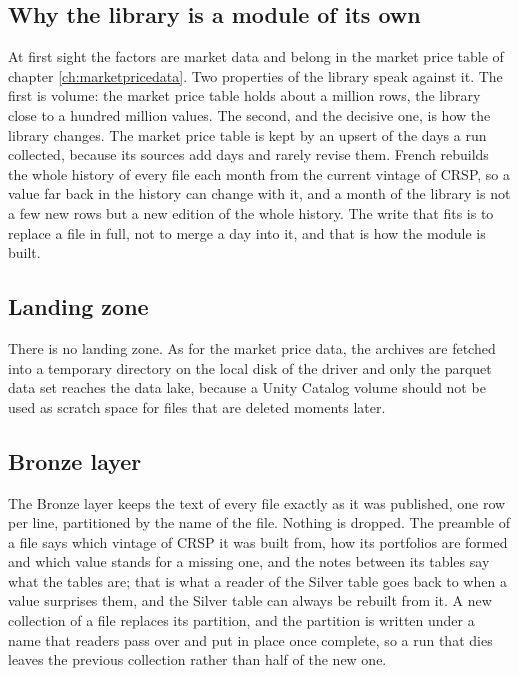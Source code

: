 \subsection{Why the library is a module of its own}

At first sight the factors are market data and belong in the market price table of chapter \ref{ch:marketpricedata}. Two properties of the library speak against it. The first is volume: the market price table holds about a million rows, the library close to a hundred million values. The second, and the decisive one, is how the library changes. The market price table is kept by an upsert of the days a run collected, because its sources add days and rarely revise them. French rebuilds the whole history of every file each month from the current vintage of CRSP, so a value far back in the history can change with it, and a month of the library is not a few new rows but a new edition of the whole history. The write that fits is to replace a file in full, not to merge a day into it, and that is how the module is built.

\subsection{Landing zone}

There is no landing zone. As for the market price data, the archives are fetched into a temporary directory on the local disk of the driver and only the parquet data set reaches the data lake, because a Unity Catalog volume should not be used as scratch space for files that are deleted moments later.

\subsection{Bronze layer}

The Bronze layer keeps the text of every file exactly as it was published, one row per line, partitioned by the name of the file. Nothing is dropped. The preamble of a file says which vintage of CRSP it was built from, how its portfolios are formed and which value stands for a missing one, and the notes between its tables say what the tables are; that is what a reader of the Silver table goes back to when a value surprises them, and the Silver table can always be rebuilt from it. A new collection of a file replaces its partition, and the partition is written under a name that readers pass over and put in place once complete, so a run that dies leaves the previous collection rather than half of the new one.


